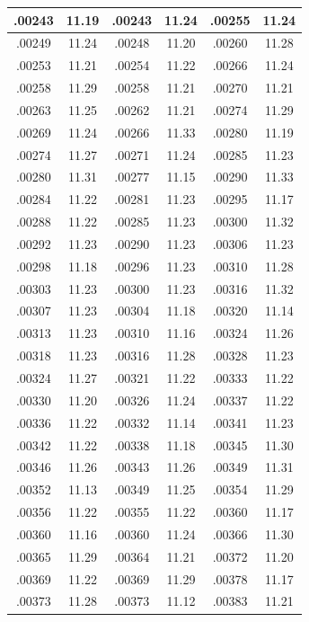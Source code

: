\documentclass[11pt]{report}
\begin{document}
\begin{appendices}
\begin{longtable}{|c|c||c|c||c|c|}
.00243 & 11.19 & .00243 & 11.24 & .00255 & 11.24\\\hline
.00249 & 11.24 & .00248 & 11.20 & .00260 & 11.28\\\hline
.00253 & 11.21 & .00254 & 11.22 & .00266 & 11.24\\\hline
.00258 & 11.29 & .00258 & 11.21 & .00270 & 11.21\\\hline
.00263 & 11.25 & .00262 & 11.21 & .00274 & 11.29\\\hline
.00269 & 11.24 & .00266 & 11.33 & .00280 & 11.19\\\hline
.00274 & 11.27 & .00271 & 11.24 & .00285 & 11.23\\\hline
.00280 & 11.31 & .00277 & 11.15 & .00290 & 11.33\\\hline
.00284 & 11.22 & .00281 & 11.23 & .00295 & 11.17\\\hline
.00288 & 11.22 & .00285 & 11.23 & .00300 & 11.32\\\hline
.00292 & 11.23 & .00290 & 11.23 & .00306 & 11.23\\\hline
.00298 & 11.18 & .00296 & 11.23 & .00310 & 11.28\\\hline
.00303 & 11.23 & .00300 & 11.23 & .00316 & 11.32\\\hline
.00307 & 11.23 & .00304 & 11.18 & .00320 & 11.14\\\hline
.00313 & 11.23 & .00310 & 11.16 & .00324 & 11.26\\\hline
.00318 & 11.23 & .00316 & 11.28 & .00328 & 11.23\\\hline
.00324 & 11.27 & .00321 & 11.22 & .00333 & 11.22\\\hline
.00330 & 11.20 & .00326 & 11.24 & .00337 & 11.22\\\hline
.00336 & 11.22 & .00332 & 11.14 & .00341 & 11.23\\\hline
.00342 & 11.22 & .00338 & 11.18 & .00345 & 11.30\\\hline
.00346 & 11.26 & .00343 & 11.26 & .00349 & 11.31\\\hline
.00352 & 11.13 & .00349 & 11.25 & .00354 & 11.29\\\hline
.00356 & 11.22 & .00355 & 11.22 & .00360 & 11.17\\\hline
.00360 & 11.16 & .00360 & 11.24 & .00366 & 11.30\\\hline
.00365 & 11.29 & .00364 & 11.21 & .00372 & 11.20\\\hline
.00369 & 11.22 & .00369 & 11.29 & .00378 & 11.17\\\hline
.00373 & 11.28 & .00373 & 11.12 & .00383 & 11.21\\\hline

\end{longtable}
\end{appendices}
\end{document}
